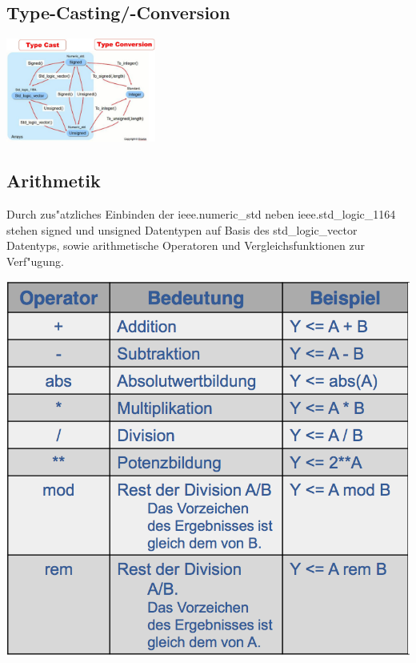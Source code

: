 \begin{multicols}{2}
	\subsection{Type-Casting/-Conversion}
	\begin{center}
		\includegraphics[width=0.37\textwidth]{images/typeConversions}
	\end{center}
	\vfill\null
	\columnbreak
	\subsection{Arithmetik}
	\begin{minipage}{0.4\linewidth}
		Durch zus"atzliches Einbinden der ieee.numeric\_std neben ieee.std\_logic\_1164 stehen signed und unsigned Datentypen auf Basis des std\_logic\_vector Datentyps, sowie arithmetische Operatoren und Vergleichsfunktionen zur Verf"ugung.
	\end{minipage}
	\begin{minipage}{0.55\linewidth}
		\includegraphics[width=\linewidth]{images/arithoperator}
	\end{minipage}
\end{multicols}
